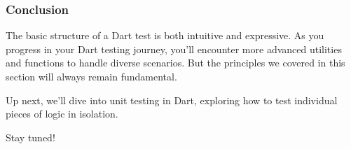 \subsubsection*{Conclusion}
The basic structure of a Dart test is both intuitive and expressive. As you progress in your Dart testing journey, you'll encounter more advanced utilities and functions to handle diverse scenarios. But the principles we covered in this section will always remain fundamental.

Up next, we'll dive into unit testing in Dart, exploring how to test individual pieces of logic in isolation.

Stay tuned!
